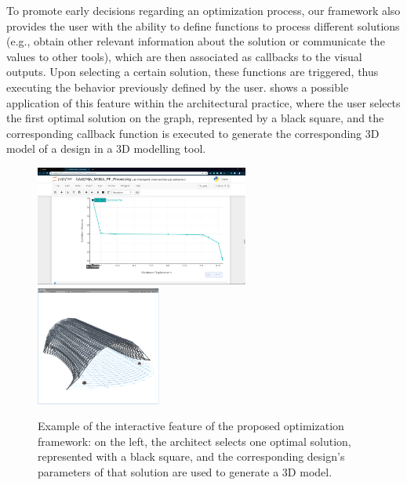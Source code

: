 To promote early decisions regarding an optimization process, our framework also provides the user with the ability to define functions to process different solutions (e.g., obtain other relevant information about the solution or communicate the values to other tools), which are then associated as callbacks to the visual outputs. Upon selecting a certain solution, these functions are triggered, thus executing the behavior previously defined by the user.  shows a possible application of this feature within the architectural practice, where the user selects the first optimal solution on the graph, represented by a black square, and the corresponding callback function is executed to generate the corresponding 3D model of a  design in a 3D modelling tool. 

\begin{figure}[htbp]
	\centering
	\includegraphics[width=0.625\textwidth]{./Images/Solution/fake-plot-browserview-square.PNG}
	\hfill
	\includegraphics[width=0.365\textwidth]{./Images/Solution/solution3-unity.png}
	
	\caption[Interactive Visualization of Optimization results]{Example of the interactive feature of the proposed optimization framework: on the left, the architect selects one optimal solution, represented with a black square, and the corresponding design's parameters of that solution are used to generate a 3D model.}
	\label{fig:interactivefeature}
\end{figure}
